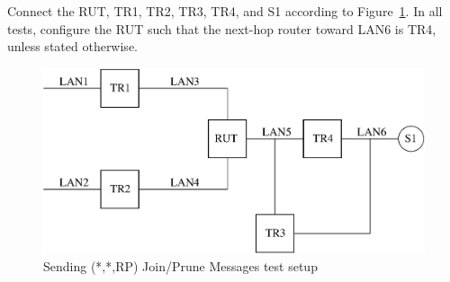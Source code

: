 \documentclass[11pt]{report}
\begin{document}
Connect the RUT, TR1, TR2, TR3, TR4, and S1 according to
Figure~\ref{fig:pim_test_4_5_sending_rp_join_prune_messages}.
In all tests, configure the RUT such that the next-hop router toward LAN6 is
TR4, unless stated otherwise.

\begin{figure}[htbp]
  \begin{center}
    \includegraphics[scale=0.8]{figs/pim_test_4_5_sending_rp_join_prune_messages}
    \caption{Sending (*,*,RP) Join/Prune Messages test setup}
    \label{fig:pim_test_4_5_sending_rp_join_prune_messages}
  \end{center}
\end{figure}


\end{document}

